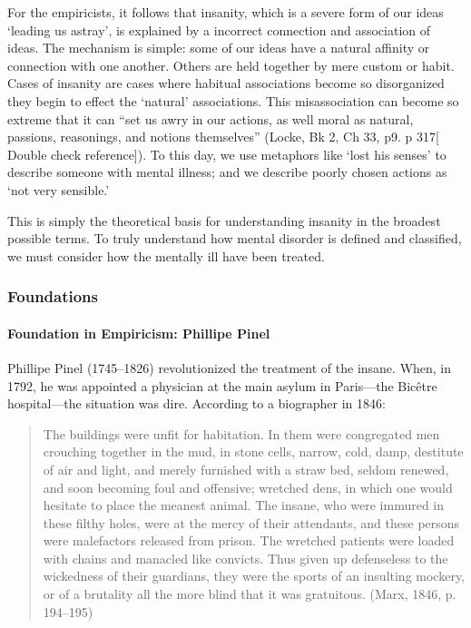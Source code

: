 For the empiricists, it follows that insanity, which is a severe form of our ideas `leading us astray', is explained by a incorrect connection and association of ideas. The mechanism is simple: some of our ideas have a natural affinity or connection with one another. Others are held together by mere custom or habit. Cases of insanity are cases where habitual associations become so disorganized they begin to effect the `natural' associations. This misassociation can become so extreme that it can ``set us awry in our actions, as well moral as natural, passions, reasonings, and notions themselves'' (Locke, Bk 2, Ch 33, p9. p 317[ Double check reference]). To this day, we use metaphors like `lost his senses' to describe someone with mental illness; and we describe poorly chosen actions as `not very sensible.'

This is simply the theoretical basis for understanding insanity in the broadest possible terms. To truly understand how mental disorder is defined and classified, we must consider how the mentally ill have been treated.

\subsubsection{Foundations}
\label{foundations}

\paragraph{Foundation in Empiricism: Phillipe Pinel}
\label{foundationinempiricism:phillipepinel}

Phillipe Pinel (1745--1826) revolutionized the treatment of the insane. When, in 1792, he was appointed a physician at the main asylum in Paris---the Bicêtre hospital---the situation was dire. According to a biographer in 1846:

\begin{quote}

The buildings were unfit for habitation. In them were congregated men crouching together in the mud, in stone cells, narrow, cold, damp, destitute of air and light, and merely furnished with a straw bed, seldom renewed, and soon becoming foul and offensive; wretched dens, in which one would hesitate to place the meanest animal. The insane, who were immured in these filthy holes, were at the mercy of their attendants, and these persons were malefactors released from prison. The wretched patients were loaded with chains and manacled like convicts. Thus given up defenseless to the wickedness of their guardians, they were the sports of an insulting mockery, or of a brutality all the more blind that it was gratuitous. (Marx, 1846, p. 194--195)
\end{quote}

